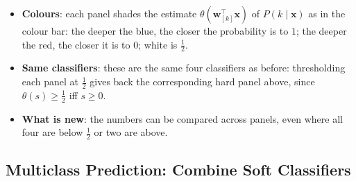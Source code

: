 \begin{itemize}
    \item \textbf{Colours}: each panel shades the estimate
        \(\theta(\bm{w}_{[k]}^\top \bm{x})\) of \(P(k \mid \bm{x})\) as in the
        colour bar: the deeper the blue, the closer the probability is to \(1\);
        the deeper the red, the closer it is to \(0\); white is \(\frac{1}{2}\).
    \item \textbf{Same classifiers}: these are the same four classifiers as
        before: thresholding each panel at \(\frac{1}{2}\) gives back the
        corresponding hard panel above, since \(\theta(s) \ge \frac{1}{2}\) iff
        \(s \ge 0\).
    \item \textbf{What is new}: the numbers can be compared across panels, even
        where all four are below \(\frac{1}{2}\) or two are above.
\end{itemize}

\subsection{Multiclass Prediction: Combine Soft Classifiers}

